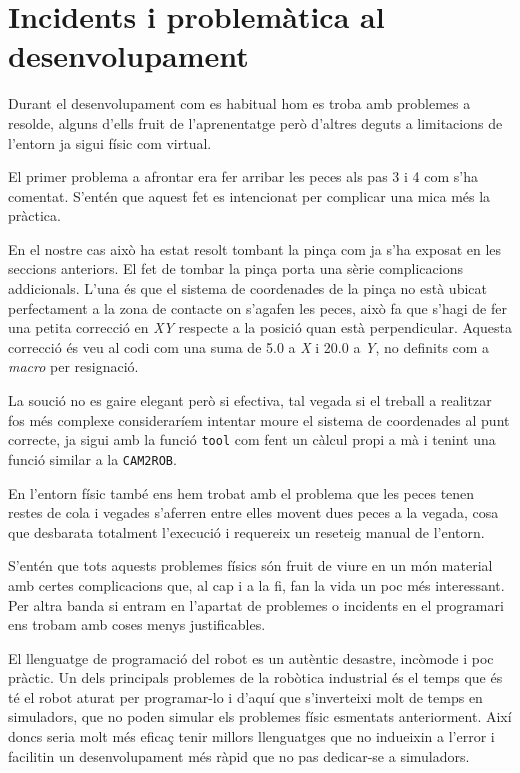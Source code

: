 \section{Incidents i problemàtica al desenvolupament}\label{incidents}

Durant el desenvolupament com es habitual hom es troba amb problemes a resolde,
alguns d'ells fruit de l'aprenentatge però d'altres deguts a limitacions
de l'entorn ja sigui físic com virtual.

El primer problema a afrontar era fer arribar les peces als pas 3 i 4 com s'ha
comentat. S'entén que aquest fet es intencionat per complicar una mica
més la pràctica.

En el nostre cas això ha estat resolt tombant la pinça com ja s'ha exposat en
les seccions anteriors. El fet de tombar la pinça porta una sèrie complicacions 
addicionals. L'una és que el sistema de coordenades de la pinça no està
ubicat perfectament a la zona de contacte on s'agafen les peces, això fa que
s'hagi de fer una petita correcció en \emph{XY} respecte
a la posició quan està perpendicular. Aquesta correcció és veu al codi com una
suma de 5.0 a \emph{X} i 20.0 a \emph{Y}, no definits com a \emph{macro}
per resignació.

La so\lgem ució no es gaire elegant però si efectiva, tal vegada si el 
treball a realitzar fos més complexe consideraríem intentar moure el sistema
de coordenades al punt correcte, ja sigui amb la funció \texttt{tool}
com fent un càlcul propi a mà i tenint una funció similar a la \texttt{CAM2ROB}.

En l'entorn físic també ens hem trobat amb el problema que les peces
tenen restes de cola i vegades s'aferren entre elles movent dues peces a la
vegada, cosa que desbarata totalment l'execució i requereix un reseteig manual
de l'entorn.

S'entén que tots aquests problemes físics són fruit de viure en un món
material amb certes complicacions que, al cap i a la fi, fan la vida un poc més
interessant. Per altra banda si entram en l'apartat de problemes o incidents
en el programari ens trobam amb coses menys justificables.

El llenguatge de programació del robot es un autèntic desastre, incòmode i
poc pràctic. Un dels principals problemes de la robòtica 
industrial és el temps que és té el robot aturat per programar-lo i 
d'aquí que s'inverteixi molt de temps en simuladors, que no poden simular
els problemes físic esmentats anteriorment. Així doncs seria molt més
eficaç tenir millors llenguatges que no indueixin a l'error i facilitin
un desenvolupament més ràpid que no pas dedicar-se a simuladors.

